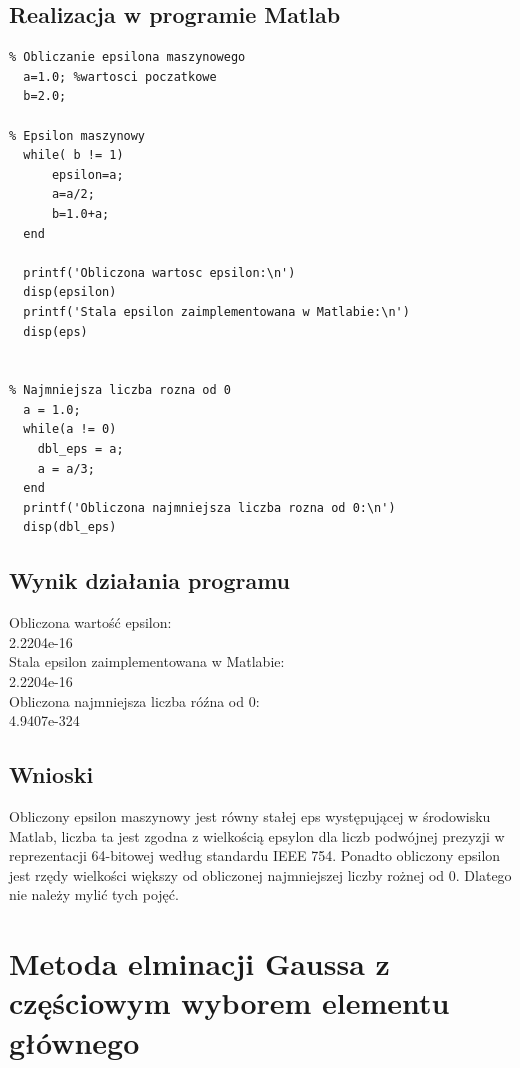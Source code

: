 \documentclass[a4paper, 11pt]{article}
\begin{document}
\subsection{Realizacja w programie Matlab}

\begin{lstlisting}
% Obliczanie epsilona maszynowego 
  a=1.0; %wartosci poczatkowe
  b=2.0; 
 
% Epsilon maszynowy 
  while( b != 1)
      epsilon=a; 
      a=a/2; 
      b=1.0+a; 
  end
  
  printf('Obliczona wartosc epsilon:\n')
  disp(epsilon)
  printf('Stala epsilon zaimplementowana w Matlabie:\n')
  disp(eps)
  
  
% Najmniejsza liczba rozna od 0
  a = 1.0;
  while(a != 0)
    dbl_eps = a; 
    a = a/3; 
  end
  printf('Obliczona najmniejsza liczba rozna od 0:\n')
  disp(dbl_eps)

\end{lstlisting}

\vspace{1cm}

\subsection{Wynik działania programu}

Obliczona wartość epsilon:\\
	2.2204e-16\\
Stala epsilon zaimplementowana w Matlabie:\\
	2.2204e-16\\
Obliczona najmniejsza liczba róźna od 0:\\
	4.9407e-324\\
	
\subsection{Wnioski}
\indent 

Obliczony epsilon maszynowy jest równy stałej eps występującej w środowisku Matlab, liczba ta jest zgodna z wielkością epsylon dla liczb podwójnej prezyzji w reprezentacji 64-bitowej według standardu IEEE 754. 
Ponadto obliczony epsilon jest rzędy wielkości większy od obliczonej najmniejszej liczby rożnej od 0. Dlatego nie należy mylić tych pojęć.~\cite{second}


\section{Metoda elminacji Gaussa z częściowym wyborem elementu głównego}
\end{document}

